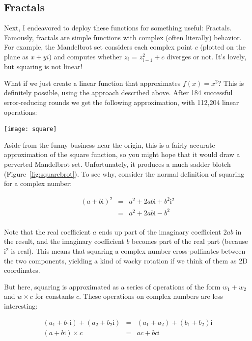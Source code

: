 \documentclass[twocolumn]{article}
\begin{document}
\subsection{Fractals} \label{sec:fractals}
Next, I endeavored to deploy these functions for something useful:
Fractals. Famously, fractals are simple functions with complex (often
literally) behavior. For example, the Mandelbrot set considers each
complex point $c$ (plotted on the plane as $x + yi$) and computes
whether $z_i$ = $z_{i-1}^2 + c$ diverges or not. It's lovely, but
squaring is not linear!

What if we just create a linear function that approximates $f(x) = x^2$?
This is definitely possible, using the approach described above. After
184 successful error-reducing rounds we get the following approximation,
with 112,204 linear operations:

\begin{center}
\texttt{[image: square]}
\end{center}

Aside from the funny business near the origin, this is a fairly
accurate approximation of the square function, so you might hope that
it would draw a perverted Mandelbrot set. Unfortunately, it produces
a much sadder blotch (Figure~\ref{fig:squarebrot}). To see why, consider
the normal definition of squaring for a complex number:

\[
\begin{array}{rcl}
  (a + b\mathrm{i})^2 & = & a^2 + 2ab\mathrm{i} + b^2\mathrm{i}^2 \\
                      & = & a^2 + 2ab\mathrm{i} - b^2 \\
\end{array}
\]

Note that the real coefficient $a$ ends up part of the imaginary
coefficient $2ab$ in the result, and the imaginary coefficient $b$
becomes part of the real part (because $\mathrm{i}^2$ is real). This
means that squaring a complex number cross-pollinates between the two
components, yielding a kind of wacky rotation if we think of them as
2D coordinates.

But here, squaring is approximated as a series of operations
of the form $w_1 + w_2$ and $w \times c$ for constants $c$.
These operations on complex numbers are less interesting:

\[
\begin{array}{rcl}
  (a_1 + b_1\mathrm{i}) + (a_2 + b_2\mathrm{i}) & = & (a_1 + a_2) + (b_1 + b_2)\mathrm{i} \\[1em]
  (a + b\mathrm{i}) \times c & = & ac + bc\mathrm{i} \\
\end{array}
\]
\end{document}
